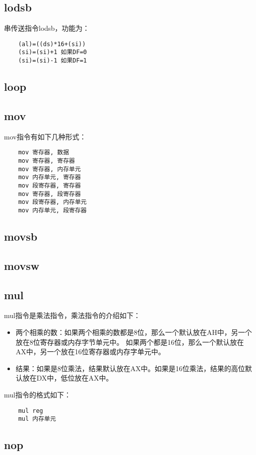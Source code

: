 \documentclass[a4paper,left=2.5cm,right=2.5cm,11pt]{article}
\begin{document}
\subsection{lodsb}
	串传送指令lodsb，功能为：
	\begin{lstlisting}
	(al)=((ds)*16+(si))
	(si)=(si)+1 如果DF=0
	(si)=(si)-1 如果DF=1
	\end{lstlisting}

\subsection{loop}
\subsection{mov}
	mov指令有如下几种形式：
	\begin{lstlisting}
	mov 寄存器, 数据
	mov 寄存器, 寄存器
	mov 寄存器, 内存单元
	mov 内存单元, 寄存器
	mov 段寄存器, 寄存器
	mov 寄存器, 段寄存器
	mov 段寄存器, 内存单元
	mov 内存单元, 段寄存器
	\end{lstlisting}

\subsection{movsb}
\subsection{movsw}
\subsection{mul}
	mul指令是乘法指令，乘法指令的介绍如下：
	\begin{itemize}
		\item 两个相乘的数：如果两个相乘的数都是8位，那么一个默认放在AH中，另一个放在8位寄存器或内存字节单元中。
			如果两个都是16位，那么一个默认放在AX中，另一个放在16位寄存器或内存字单元中。
		\item 结果：如果是8位乘法，结果默认放在AX中。如果是16位乘法，结果的高位默认放在DX中，低位放在AX中。
	\end{itemize}
	
	mul指令的格式如下：
	\begin{lstlisting}
	mul reg
	mul 内存单元
	\end{lstlisting}
	
\subsection{nop}
\end{document}
